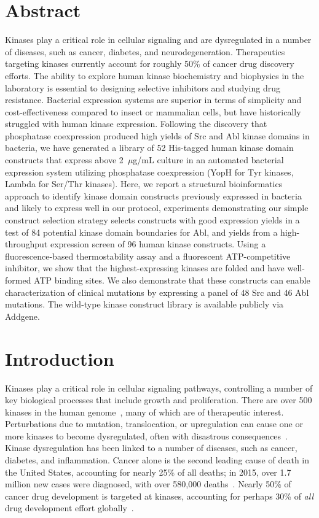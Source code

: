 \documentclass[phd,tocprelim]{cornell}
\begin{document}
\section{Abstract}
Kinases play a critical role in cellular signaling and are dysregulated in a number of diseases, such as cancer, diabetes, and neurodegeneration. 
Therapeutics targeting kinases currently account for roughly 50\% of cancer drug discovery efforts. The ability to explore human kinase biochemistry and biophysics in the laboratory is essential to designing selective inhibitors and studying drug resistance. 
Bacterial expression systems are superior in terms of simplicity and cost-effectiveness compared to insect or mammalian cells, but have historically struggled with human kinase expression.
Following the discovery that phosphatase coexpression produced high yields of Src and Abl kinase domains in bacteria, we have generated a library of 52 His-tagged human kinase domain constructs that express above 2~$\mu$g/mL culture in an automated bacterial expression system utilizing phosphatase coexpression (YopH for Tyr kinases, Lambda for Ser/Thr kinases). 
Here, we report a structural bioinformatics approach to identify kinase domain constructs previously expressed in bacteria and likely to express well in our protocol, experiments demonstrating our simple construct selection strategy selects constructs with good expression yields in a test of 84 potential kinase domain boundaries for Abl, and yields from a high-throughput expression screen of 96 human kinase constructs.
Using a fluorescence-based thermostability assay and a fluorescent ATP-competitive inhibitor, we show that the highest-expressing kinases are folded and have well-formed ATP binding sites.
We also demonstrate that these constructs can enable characterization of clinical mutations by expressing a panel of 48 Src and 46 Abl mutations. 
The wild-type kinase construct library is available publicly via Addgene. 

\section{Introduction}

Kinases play a critical role in cellular signaling pathways, controlling a number of key biological processes that include growth and proliferation. 
There are over 500 kinases in the human genome~\citep{manning:science:2002:kinome,Hunter:ReceptorTyrosineKinases:StructureFunctionsandRoleinHumanDisease:2015}, many of which are of therapeutic interest.
Perturbations due to mutation, translocation, or upregulation can cause one or more kinases to become dysregulated, often with disastrous consequences~\citep{knight_targeting_2010}.
Kinase dysregulation has been linked to a number of diseases, such as cancer, diabetes, and inflammation.
Cancer alone is the second leading cause of death in the United States, accounting for nearly 25\% of all deaths; in 2015, over 1.7 million new cases were diagnosed, with over 580,000 deaths~\citep{acs-cancer-facts-2015}. 
Nearly 50\% of cancer drug development is targeted at kinases, accounting for perhaps 30\% of \emph{all} drug development effort globally~\citep{cohen_will_2010,Santos:Nat.Rev.DrugDiscov.:2016}. 
\end{document}
